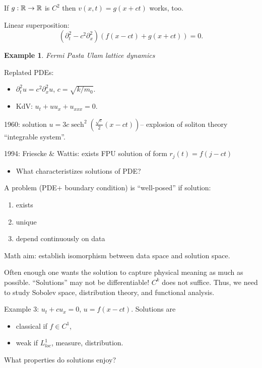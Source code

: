 \documentclass[11pt]{amsart}%
\newtheorem{example}{Example}
\DeclareMathOperator{\sech}{sech}
\begin{document}
If \(g:\mathbb{R}\to\mathbb{R}\) is \(C^2\) then \(v(x,t)=g(x+ct)\) works, too.

Linear superposition:
\[(\partial_t^2-c^2\partial_x^2)(f(x-ct)+g(x+ct))=0.\]

\begin{example} Fermi Pasta Ulam lattice dynamics
\end{example}
Replated PDEs:

\begin{itemize}
\item
  \(\partial_t^2 u = c^2\partial_x^2 u\), \(c=\sqrt{k/m_0}\).
\item
  KdV: \(u_t+uu_x+u_{xxx}=0\).
\end{itemize}

1960: solution \(u=3c \sech^2(\frac{\sqrt{c}}{2}(x-ct))\)-- explosion of
soliton theory ``integrable system''.

1994: Friescke \& Wattis: exists FPU solution of form \(r_j(t)=f(j-ct)\)

\begin{itemize}
\item
  What characteristizes solutions of PDE?
\end{itemize}

A problem (PDE+ boundary condition) is ``well-posed'' if solution:

\begin{enumerate}
\def\labelenumi{\arabic{enumi}.}
\item
  exists
\item
  unique
\item
  depend continuously on data
\end{enumerate}

Math aim: establish isomorphism between data space and solution space.

Often enough one wants the solution to capture physical meaning as much
as possible. ``Solutions'' may not be differentiable! \(C^k\) does not
suffice. Thus, we need to study Sobolev space, distribution theory, and
functional analysis.

Example 3: \(u_t+cu_x=0\), \(u=f(x-ct)\). Solutions are

\begin{itemize}
\item
  classical if \(f\in C^1\),
\item
  weak if \(L^1_{loc}\), measure, distribution.
\end{itemize}

What properties do solutions enjoy?
\end{document}
